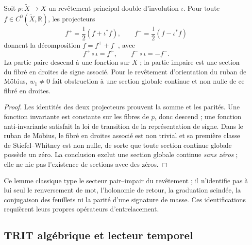 \begin{theorem}
\label{pf84:A10-md-mobius}
Soit \(p:\widetilde X\to X\) un revêtement principal double d'involution
\(\iota\). Pour toute \(f\in C^0(\widetilde X,\mathbb R)\), les projecteurs
\[
 f^+=\frac12(f+\iota^*f),\qquad
 f^-=\frac12(f-\iota^*f)
\]
donnent la décomposition \(f=f^++f^-\), avec
\[
 f^+\circ\iota=f^+,\qquad f^-\circ\iota=-f^-.
\]
La partie paire descend à une fonction sur \(X\) ; la partie impaire est une
section du fibré en droites de signe associé. Pour le revêtement d'orientation
du ruban de Möbius, \(w_1\ne0\) fait obstruction à une section globale continue
et non nulle de ce fibré en droites.
\end{theorem}

\begin{proof}
Les identités des deux projecteurs prouvent la somme et les parités. Une
fonction invariante est constante sur les fibres de \(p\), donc
descend ; une fonction anti-invariante satisfait la loi de transition de la
représentation de signe. Dans le ruban de Möbius, le fibré en droites associé est non
trivial et sa première classe de Stiefel--Whitney est non nulle, de sorte que toute
section continue globale possède un zéro. La conclusion exclut une
section globale continue \emph{sans zéros} ; elle ne nie pas l'existence de
sections avec des zéros.
\end{proof}

Ce lemme classique type le secteur pair--impair du revêtement ; il n'identifie pas
à lui seul le renversement de mot, l'holonomie de retour, la
graduation scindée, la conjugaison des feuillets ni la parité d'une signature de
masse. Ces identifications requièrent leurs propres opérateurs d'entrelacement.

\subsection{TRIT algébrique et lecteur temporel}

